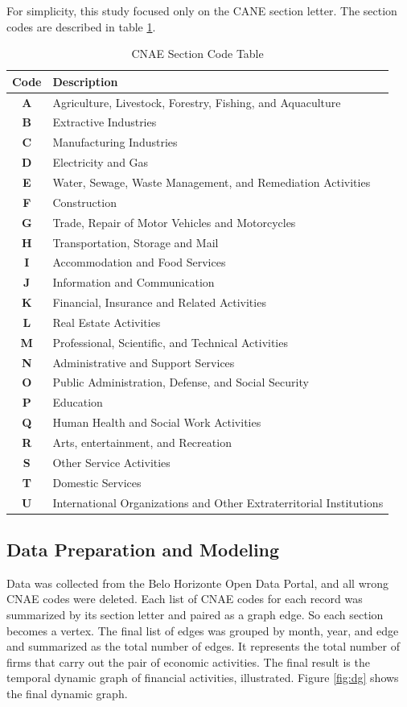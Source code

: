\documentclass[12pt]{article}
\begin{document}
For simplicity, this study focused only on the CANE section letter. The section codes are described in table \ref{tab:exTable1}.
\begin{table}[H]
\centering
\vspace{3mm}
\begin{tabular}{cl}
\textbf{Code} & Description \\
\hline
\textbf{A} & Agriculture, Livestock, Forestry, Fishing, and Aquaculture \\ 
\textbf{B} & Extractive Industries \\ 
\textbf{C} & Manufacturing Industries \\ 
\textbf{D} & Electricity and Gas \\
\textbf{E} & Water, Sewage, Waste Management, and Remediation Activities \\
\textbf{F} & Construction \\
\textbf{G} & Trade, Repair of Motor Vehicles and Motorcycles \\
\textbf{H} & Transportation, Storage and Mail \\
\textbf{I} & Accommodation and Food Services \\
\textbf{J} & Information and Communication \\
\textbf{K} & Financial, Insurance and Related Activities \\
\textbf{L} & Real Estate Activities \\
\textbf{M} & Professional, Scientific, and Technical Activities \\
\textbf{N} & Administrative and Support Services \\
\textbf{O} & Public Administration, Defense, and Social Security \\
\textbf{P} & Education \\
\textbf{Q} & Human Health and Social Work Activities \\
\textbf{R} & Arts, entertainment, and Recreation \\
\textbf{S} & Other Service Activities \\
\textbf{T} & Domestic Services \\ 
\textbf{U} & International Organizations and Other Extraterritorial Institutions \\
\hline
\hline
\end{tabular}
\caption{CNAE Section Code Table}
\label{tab:exTable1}
\end{table}


\subsection{Data Preparation and Modeling} 
Data was collected from the Belo Horizonte Open Data Portal, and all wrong CNAE codes were deleted. Each list of CNAE codes for each record was summarized by its section letter and paired as a graph edge. So each section becomes a vertex. The final list of edges was grouped by month, year, and edge and summarized as the total number of edges. It represents the total number of firms that carry out the pair of economic activities. The final result is the temporal dynamic graph of financial activities, illustrated. Figure \ref{fig:dg} shows the final dynamic graph.
\end{document}
